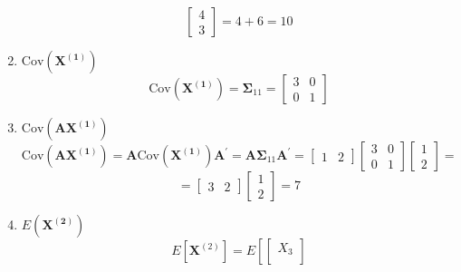 \begin{enumerate}[label=(\alph*)]
\[                \begin{bmatrix}
                    4 \\
                    3
                \end{bmatrix}
                =
                4 + 6 = 10
            \]
            \item $\text{Cov}\left(\mathbf{X^{(1)}}\right)$
            \[
                \text{Cov}\left(\mathbf{X^{(1)}}\right)
                =
                \mathbf{\Sigma}_{11}
                =
                \begin{bmatrix}
                    3 & 0 \\
                    0 & 1
                \end{bmatrix}
            \]
            \item $\text{Cov}\left(\mathbf{A}\mathbf{X^{(1)}}\right)$
            \[
                \text{Cov}\left(\mathbf{A}\mathbf{X^{(1)}}\right)
                =
                \mathbf{A}\text{Cov}\left(\mathbf{X^{(1)}}\right)\mathbf{A}^\prime
                =
                \mathbf{A}\mathbf{\Sigma}_{11}\mathbf{A}^\prime
                =
                \begin{bmatrix}
                    1 & 2
                \end{bmatrix}
                \begin{bmatrix}
                    3 & 0 \\
                    0 & 1
                \end{bmatrix}
                \begin{bmatrix}
                    1 \\
                    2
                \end{bmatrix}
                =
            \]
            \[
                =
                \begin{bmatrix}
                    3 & 2
                \end{bmatrix}
                \begin{bmatrix}
                    1 \\
                    2
                \end{bmatrix}
                = 7
            \]
            \item $E\left(\mathbf{X^{(2)}}\right)$
            \[
                E\left[\mathbf{X}^{(2)}\right]
                = 
                E\left[
                    \begin{bmatrix}
                        X_3 \\

\end{bmatrix}\]
\end{enumerate}
